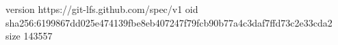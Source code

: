 version https://git-lfs.github.com/spec/v1
oid sha256:6199867dd025e474139fbe8eb407247f79fcb90b77a4c3daf7ffd73c2e33cda2
size 143557
